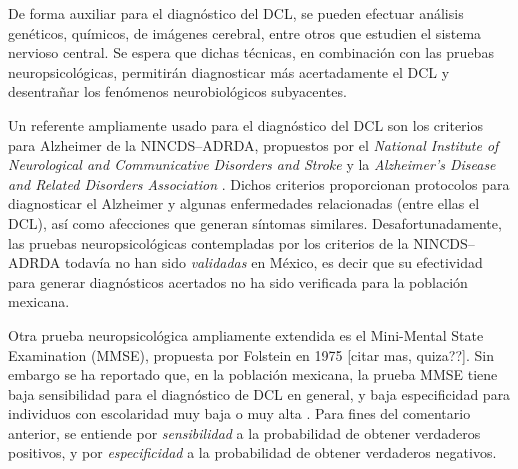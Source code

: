 De forma auxiliar para el diagnóstico del DCL, se pueden efectuar análisis genéticos, químicos, de imágenes cerebral, entre otros que estudien el sistema nervioso central.
%
Se espera que dichas técnicas, en combinación con las pruebas neuropsicológicas, permitirán diagnosticar más acertadamente el DCL y desentrañar los fenómenos neurobiológicos subyacentes.

Un referente ampliamente usado para el diagnóstico del DCL son los criterios para Alzheimer de la NINCDS--ADRDA, propuestos %
por el \textit{National Institute of Neurological and Communicative Disorders and Stroke} y la \textit{Alzheimer's Disease and Related Disorders Association} \cite{McKhann,Dubois07}. 
%
Dichos criterios proporcionan protocolos para diagnosticar el Alzheimer y algunas enfermedades relacionadas (entre ellas el DCL), así como afecciones que generan síntomas similares. 
%
%
Desafortunadamente, las pruebas neuropsicológicas contempladas por los criterios de la NINCDS--ADRDA todavía no han sido \textit{validadas} en México, es decir que su efectividad para generar diagnósticos acertados no ha sido verificada para la población mexicana. 
%

Otra prueba neuropsicológica ampliamente extendida es el Mini-Mental State Examination (MMSE), propuesta por Folstein en 1975 \cite{folstein75} [citar mas, quiza??].
%
Sin embargo se ha reportado que, en la población mexicana, la prueba MMSE tiene baja sensibilidad para el diagnóstico de DCL en general, y baja especificidad para individuos con escolaridad muy baja o muy alta \cite{Ostrosky00}.
%
Para fines del comentario anterior, se entiende por \textit{sensibilidad} a la probabilidad de obtener verdaderos positivos, y por \textit{especificidad} a la probabilidad de obtener verdaderos negativos.

%
%

